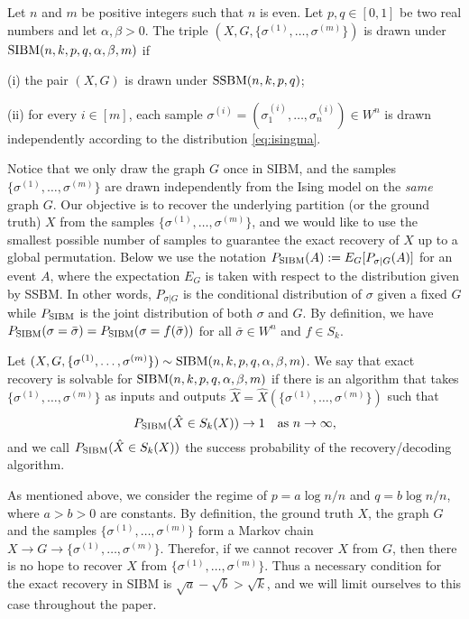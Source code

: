 \documentclass{article}
\begin{document}
\begin{definition}
Let $n$ and $m$ be positive integers such that $n$ is even. Let $p,q\in[0,1]$ be two real numbers and let $\alpha,\beta>0$. The triple $(X,G,\{\sigma^{(1)},\dots,\sigma^{(m)}\})$ is drawn under $\operatorname{SIBM}(n,k, p,q,\alpha,\beta,m)$ if

\noindent
(i) the pair $(X,G)$ is drawn under $\operatorname{SSBM}(n,k, p,q)$;

\noindent
(ii) for every $i\in[m]$, each sample $\sigma^{(i)}=(\sigma_1^{(i)},\dots,\sigma_n^{(i)}) \in W^n$ is drawn independently according to the distribution \eqref{eq:isingma}.
\end{definition}

Notice that we only draw the graph $G$ once in SIBM, and the samples $\{\sigma^{(1)},\dots,\sigma^{(m)}\}$ are drawn independently from the Ising model on the {\em same} graph $G$.
Our objective is to recover the underlying partition (or the ground truth) $X$ from the samples $\{\sigma^{(1)},\dots,\sigma^{(m)}\}$, and we would like to use the smallest possible number of samples to guarantee the exact recovery of $X$ up to a global permutation.
Below we use the notation $P_{\operatorname{SIBM}}(A):=E_G[P_{\sigma|G}(A)]$ for an event $A$, where the expectation $E_G$ is taken with respect to the distribution given by SSBM. In other words, $P_{\sigma|G}$ is the conditional distribution of  $\sigma$ given a fixed $G$ while $P_{\operatorname{SIBM}}$ is the joint distribution of both $\sigma$ and $G$.
By definition, we have $P_{\operatorname{SIBM}}(\sigma=\bar{\sigma})=P_{\operatorname{SIBM}}(\sigma=f(\bar{\sigma}))$ for all $\bar{\sigma}\in W^n$ and $f \in S_k$.

\begin{definition}
Let $(X,G,\{\sigma^{(1)},\dots,\sigma^{(m)}\}) \sim \operatorname{SIBM}(n,k, p,q,\alpha,\beta,m)$.
We say that exact recovery is solvable for $\operatorname{SIBM}(n,k,p,q,\alpha,\beta,m)$ if there is an algorithm that takes $\{\sigma^{(1)},\dots,\sigma^{(m)}\}$ as inputs and outputs $\hat{X}=\hat{X}(\{\sigma^{(1)},\dots,\sigma^{(m)}\})$ such that
$$
P_{\operatorname{SIBM}}(\hat{X} \in S_k(X)) \to 1
\text{~~~as~} n\to\infty ,
$$
and we call $P_{\operatorname{SIBM}}(\hat{X} \in S_k(X))$ the success probability of the recovery/decoding algorithm.
\end{definition}


As mentioned above, we consider the regime of $p=a\log n/n$ and $q=b\log n/n$, where $a>b> 0$ are constants. By definition, the ground truth $X$, the graph $G$ and the samples $\{\sigma^{(1)},\dots,\sigma^{(m)}\}$ form a Markov chain $X\to G\to \{\sigma^{(1)},\dots,\sigma^{(m)}\}$. Therefor, if we cannot recover $X$ from $G$, then there is no hope to recover $X$ from $\{\sigma^{(1)},\dots,\sigma^{(m)}\}$. Thus a necessary condition for the exact recovery in SIBM is $\sqrt{a}-\sqrt{b}> \sqrt{k}$, and we will limit ourselves to this case throughout the paper.
\end{document}
